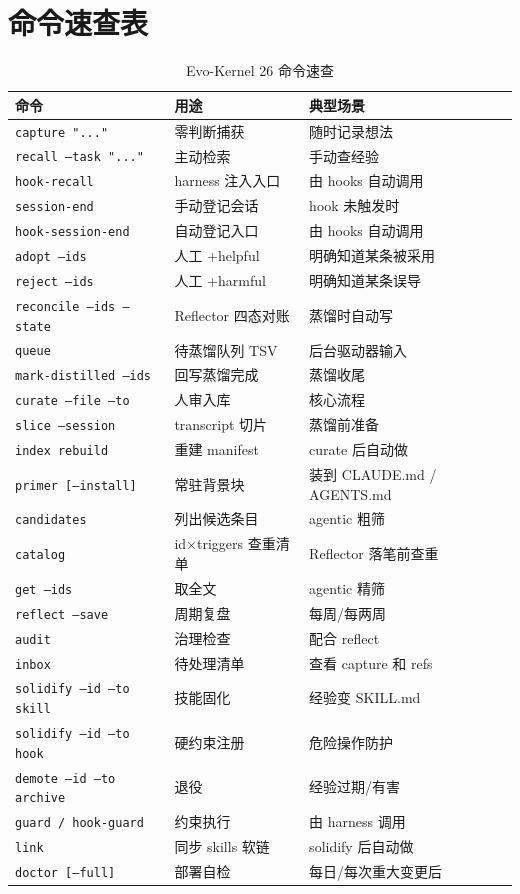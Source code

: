 \documentclass[12pt,a4paper]{ctexart}
\begin{document}
\section{命令速查表}

\begin{table}[H]
\centering
\caption{Evo-Kernel 26 命令速查}
\begin{tabular}{@{}lll@{}}
\toprule
\textbf{命令} & \textbf{用途} & \textbf{典型场景} \\
\midrule
\texttt{capture "..."} & 零判断捕获 & 随时记录想法 \\
\texttt{recall --task "..."} & 主动检索 & 手动查经验 \\
\texttt{hook-recall} & harness 注入入口 & 由 hooks 自动调用 \\
\texttt{session-end} & 手动登记会话 & hook 未触发时 \\
\texttt{hook-session-end} & 自动登记入口 & 由 hooks 自动调用 \\
\texttt{adopt --ids} & 人工 +helpful & 明确知道某条被采用 \\
\texttt{reject --ids} & 人工 +harmful & 明确知道某条误导 \\
\texttt{reconcile --ids --state} & Reflector 四态对账 & 蒸馏时自动写 \\
\texttt{queue} & 待蒸馏队列 TSV & 后台驱动器输入 \\
\texttt{mark-distilled --ids} & 回写蒸馏完成 & 蒸馏收尾 \\
\texttt{curate --file --to} & 人审入库 & 核心流程 \\
\texttt{slice --session} & transcript 切片 & 蒸馏前准备 \\
\texttt{index rebuild} & 重建 manifest & curate 后自动做 \\
\texttt{primer [--install]} & 常驻背景块 & 装到 CLAUDE.md / AGENTS.md \\
\texttt{candidates} & 列出候选条目 & agentic 粗筛 \\
\texttt{catalog} & id×triggers 查重清单 & Reflector 落笔前查重 \\
\texttt{get --ids} & 取全文 & agentic 精筛 \\
\texttt{reflect --save} & 周期复盘 & 每周/每两周 \\
\texttt{audit} & 治理检查 & 配合 reflect \\
\texttt{inbox} & 待处理清单 & 查看 capture 和 refs \\
\texttt{solidify --id --to skill} & 技能固化 & 经验变 SKILL.md \\
\texttt{solidify --id --to hook} & 硬约束注册 & 危险操作防护 \\
\texttt{demote --id --to archive} & 退役 & 经验过期/有害 \\
\texttt{guard / hook-guard} & 约束执行 & 由 harness 调用 \\
\texttt{link} & 同步 skills 软链 & solidify 后自动做 \\
\texttt{doctor [--full]} & 部署自检 & 每日/每次重大变更后 \\
\bottomrule
\end{tabular}
\end{table}
\end{document}
